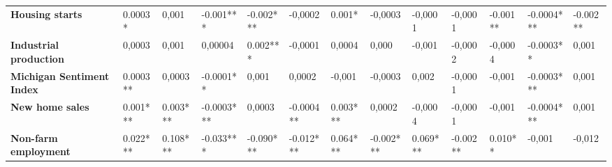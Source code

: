 \begin{landscape}
\begin{table}[]
{\begin{tabular}{@{}lllllllllllll@{}}
\textbf{Housing starts}           & 0.0003*                                 & 0,001                                   & -0.001***                               & -0.002***                               & -0,0002                                 & 0.001*                                  & -0,0003                                 & -0,0001                                 & -0,0001                                 & -0.001**                                & -0.0004***                              & -0.002**                                \\
\textbf{Industrial production}    & 0,0003                                  & 0,001                                   & 0,00004                                 & 0.002***                                & -0,0001                                 & 0,0004                                  & 0,000                                   & -0,001                                  & -0,0002                                 & -0,0004                                 & -0.0003**                               & 0,001                                   \\
\textbf{Michigan Sentiment Index} & 0.0003**                                & 0,0003                                  & -0.0001**                               & 0,001                                   & 0,0002                                  & -0,001                                  & -0,0003                                 & 0,002                                   & -0,0001                                 & -0,001                                  & -0.0003***                              & 0,001                                   \\
\textbf{New home sales}           & 0.001***                                & 0.003***                                & -0.0003***                              & 0,0003                                  & -0.0004**                               & 0.003***                                & 0,0002                                  & -0,0004                                 & -0,0001                                 & -0,001                                  & -0.0004***                              & 0,001                                   \\
\textbf{Non-farm employment}      & 0.022***                                & 0.108***                                & -0.033***                               & -0.090***                               & -0.012***                               & 0.064***                                & -0.002***                               & 0.069***                                & -0.002**                                & 0.010**                                 & -0,001                                  & -0,012                                  \\

\end{tabular}}
\end{table}
\end{landscape}
